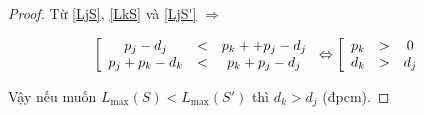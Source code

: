 \documentclass[12pt,a4paper]{report}
\begin{document}
\begin{proof}
	Từ \eqref{LjS}, \eqref{LkS} và \eqref{LjS'}
	$\Rightarrow$

	\begin{equation*}
		\left[
			\begin{array}{c c c}
				p_j - d_j & < & p_k + + p_j - d_j \\
				p_j + p_k - d_k & < & p_k + p_j - d_j
			\end{array}
		\right.
		\Leftrightarrow
		\left[
			\begin{array}{c c c}
				p_k & > & 0 \\
				d_k & > & d_j
			\end{array}
		\right.
	\end{equation*}

	Vậy nếu muốn $L_{\max}(S) < L_{\max}(S')$ thì $d_k > d_j$ (đpcm).
\end{proof}
\end{document}
